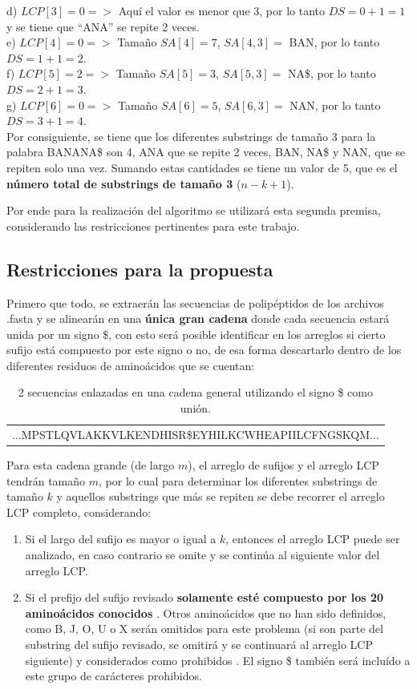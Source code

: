 d) $LCP[3]=0 =>$ Aquí el valor es menor que 3, por lo tanto $DS=0+1=1$ y se tiene que ``ANA'' se repite 2 veces.\\
e) $LCP[4]=0 =>$ Tamaño $SA[4] = 7$, $SA[4,3] =$ BAN, por lo tanto $DS=1+1=2$.\\
f) $LCP[5]=2 =>$ Tamaño $SA[5] = 3$, $SA[5,3] =$ NA\$, por lo tanto $DS=2+1=3$.\\
g) $LCP[6]=0 =>$ Tamaño $SA[6] = 5$, $SA[6,3] =$ NAN, por lo tanto $DS=3+1=4$.\\

Por consiguiente, se tiene que los diferentes substrings de tamaño 3 para la palabra BANANA\$ son 4, ANA que se repite 2 veces, BAN, NA\$ y NAN, que se repiten solo una vez. Sumando estas cantidades se tiene un valor de 5, que es el \textbf{número total de substrings de tamaño 3} ($n-k+1$).

Por ende para la realización del algoritmo se utilizará esta segunda premisa, considerando las restricciones pertinentes para este trabajo.

\subsection{Restricciones para la propuesta}

Primero que todo, se extraerán las secuencias de polipéptidos de los archivos .fasta y se alinearán en una \textbf{única gran cadena} donde cada secuencia estará unida por un signo \$, con esto será posible identificar en los arreglos si cierto sufijo está compuesto por este signo o no, de esa forma descartarlo dentro de los diferentes residuos de aminoácidos que se cuentan:

\begin{table}[h]
\centering
\label{propuesta-22}
\begin{tabular}{c}
$\ldots$MPSTLQVLAKKVLKENDHISR\$EYHILKCWHEAPIILCFNGSKQM$\ldots$\\ 
\end{tabular}
\caption{2 secuencias enlazadas en una cadena general utilizando el signo \$ como unión.}
\end{table}

Para esta cadena grande (de largo $m$), el arreglo de sufijos y el arreglo LCP tendrán tamaño $m$, por lo cual para determinar los diferentes substrings de tamaño $k$ y aquellos substrings que más se repiten se debe recorrer el arreglo LCP completo, considerando:

\begin{enumerate}
\item Si el largo del sufijo es mayor o igual a $k$, entonces el arreglo LCP puede ser analizado, en caso contrario se omite y se continúa al siguiente valor del arreglo LCP.
\item Si el prefijo del sufijo revisado \textbf{solamente esté compuesto por los 20 aminoácidos conocidos} \cite{biomolecula}. Otros aminoácidos que no han sido definidos, como B, J, O, U o X serán omitidos para este problema (si son parte del substring del sufijo revisado, se omitirá y se continuará al arreglo LCP siguiente) y considerados como prohibidos \cite{aminoacids}. El signo \$ también será incluído a este grupo de carácteres prohibidos.
\end{enumerate}

